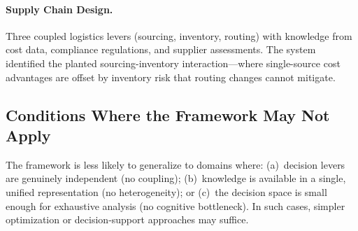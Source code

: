\paragraph{Supply Chain Design.}
Three coupled logistics levers (sourcing, inventory, routing) with knowledge from cost data, compliance regulations, and supplier assessments.
The system identified the planted sourcing-inventory interaction---where single-source cost advantages are offset by inventory risk that routing changes cannot mitigate.

\subsection{Conditions Where the Framework May Not Apply}

The framework is less likely to generalize to domains where:
(a)~decision levers are genuinely independent (no coupling);
(b)~knowledge is available in a single, unified representation (no heterogeneity); or
(c)~the decision space is small enough for exhaustive analysis (no cognitive bottleneck).
In such cases, simpler optimization or decision-support approaches may suffice.
